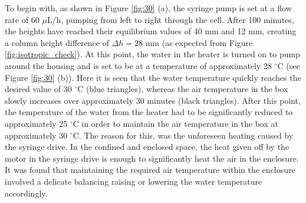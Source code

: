 To begin with, as shown in Figure \ref{fig:30} (a), the syringe pump is set at a flow rate of 60 $\mu$L/h, pumping from left to right through the cell. After 100 minutes, the heights have reached their equilibrium values of 40 mm and 12 mm, creating a column height difference of $\Delta h=28\text{ mm}$ (as expected from Figure \ref{fig:isotropic_check}). At this point, the water in the heater is turned on to pump around the housing and is set to be at a temperature of approximately 28 $^{\circ}$C (see Figure \ref{fig:30} (b)). Here it is seen that the water temperature quickly reaches the desired value of 30 $^{\circ}\text{C}$ (blue triangles), whereas the air temperature in the box slowly increases over approximately 30 minutes (black triangles). After this point, the temperature of the water from the heater had to be significantly reduced to approximately 25 $^{\circ}\text{C}$ in order to maintain the air temperature in the box at approximately 30 $^{\circ}\text{C}$. The reason for this, was the unforeseen heating caused by the syringe drive. In the confined and enclosed space, the heat given off by the motor in the syringe drive is enough to significantly heat the air in the enclosure. It was found that maintaining the required air temperature within the enclosure involved a delicate balancing raising or lowering the water temperature accordingly.

